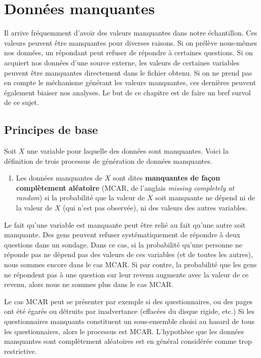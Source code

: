 \documentclass[
  11pt,
  letterpaper,
]{scrbook}
\providecommand{\tightlist}{%
  \setlength{\itemsep}{0pt}\setlength{\parskip}{0pt}}\usepackage{longtable,booktabs,array}
\theoremstyle{definition}
\theoremstyle{remark}
\begin{document}

\chapter{Données manquantes}\label{donnees-manquantes}

Il arrive fréquemment d'avoir des valeurs manquantes dans notre
échantillon. Ces valeurs peuvent être manquantes pour diverses raisons.
Si on prélève nous-mêmes nos données, un répondant peut refuser de
répondre à certaines questions. Si on acquiert nos données d'une source
externe, les valeurs de certaines variables peuvent être manquantes
directement dans le fichier obtenu. Si on ne prend pas en compte le
méchanisme générant les valeurs manquantes, ces dernières peuvent
également biaiser nos analyses. Le but de ce chapitre est de faire un
bref survol de ce sujet.

\section{Principes de base}\label{principes-de-base}

Soit \(X\) une variable pour laquelle des données sont manquantes. Voici
la définition de trois processus de génération de données manquantes.

\begin{enumerate}
\def\labelenumi{\arabic{enumi})}
\tightlist
\item
  Les données manquantes de \(X\) sont dites \textbf{manquantes de façon
  complètement aléatoire} (MCAR, de l'anglais \emph{missing completely
  at random}) si la probabilité que la valeur de \(X\) soit manquante ne
  dépend ni de la valeur de \(X\) (qui n'est pas observée), ni des
  valeurs des autres variables.
\end{enumerate}

Le fait qu'une variable est manquante peut être relié au fait qu'une
autre soit manquante. Des gens peuvent refuser systématiquement de
répondre à deux questions dans un sondage. Dans ce cas, si la
probabilité qu'une personne ne réponde pas ne dépend pas des valeurs de
ces variables (et de toutes les autres), nous sommes encore dans le cas
MCAR. Si par contre, la probabilité que les gens ne répondent pas à une
question sur leur revenu augmente avec la valeur de ce revenu, alors
nous ne sommes plus dans le cas MCAR.

Le cas MCAR peut se présenter par exemple si des questionnaires, ou des
pages ont été égarés ou détruits par inadvertance (effacées du disque
rigide, etc.) Si les questionnaires manquants constituent un
sous-ensemble choisi au hasard de tous les questionnaires, alors le
processus est MCAR. L'hypothèse que les données manquantes sont
complètement aléatoires est en général considérée comme trop
restrictive.
\end{document}

